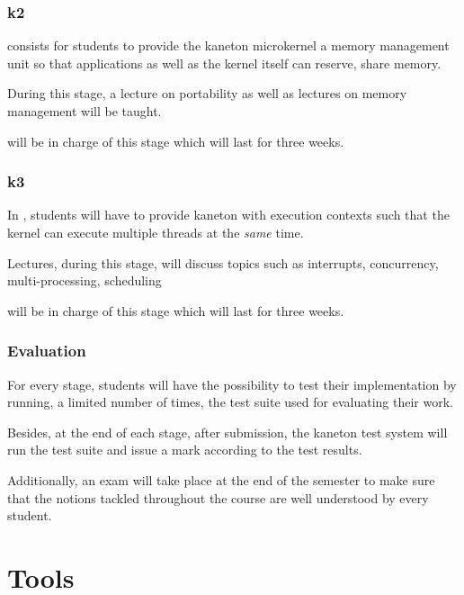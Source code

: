 
\begin{frame}
  \frametitle{k2}

   consists for students to provide the kaneton microkernel a
  memory management unit so that applications as well as the kernel itself
  can reserve, share \etc{} memory.

  \-

  During this stage, a lecture on portability as well as lectures on
  memory management will be taught.

  \-

   will be in charge of this stage which will last
  for three weeks.
\end{frame}


\begin{frame}
  \frametitle{k3}

  In , students will have to provide kaneton with execution contexts
  such that the kernel can execute multiple threads at the \textit{same} time.

  \-

  Lectures, during this stage, will discuss topics such as interrupts,
  concurrency, multi-processing, scheduling \etc{}

  \-

   will be in charge of this stage which will last for
  three weeks.
\end{frame}


\begin{frame}
  \frametitle{Evaluation}

  For every stage, students will have the possibility to test their
  implementation by running, a limited number of times, the test suite used
  for evaluating their work.

  \-

  Besides, at the end of each stage, after submission, the kaneton test system
  will run the test suite and issue a mark according to the test results.

  \-

  Additionally, an exam will take place at the end of the semester to make
  sure that the notions tackled throughout the course are well understood
  by every student.
\end{frame}

%
%

\section{Tools}

